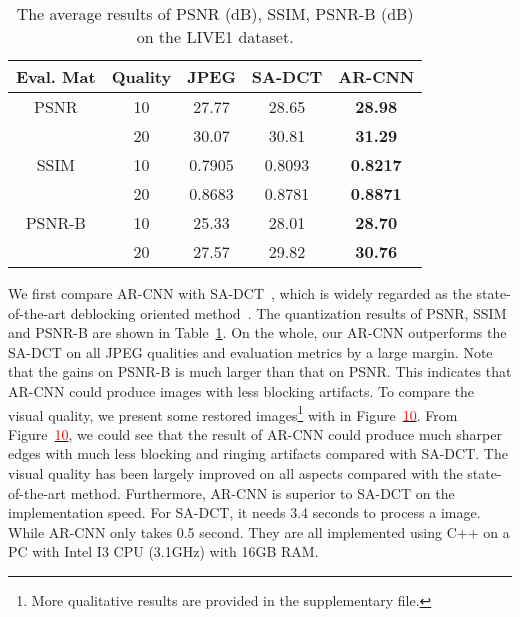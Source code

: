 \documentclass[10pt,twocolumn,letterpaper]{article}
\begin{document}
\label{sec:sadct}
\begin{table}\scriptsize
\caption{The average results of PSNR (dB), SSIM, PSNR-B (dB) on the LIVE1 dataset.}\label{tab:sadct}
\vspace{-0.15cm}
\begin{center}
\begin{tabular}{|c|c|c|c|c|}
\hline
 Eval. Mat & Quality & JPEG & SA-DCT & AR-CNN \\

\hline\hline
PSNR & 10 & 27.77 & 28.65 & \textbf{28.98}   \\
     & 20 & 30.07 & 30.81 & \textbf{31.29}   \\
\hline\hline
SSIM & 10 & 0.7905 & 0.8093 & \textbf{0.8217}   \\
     & 20 & 0.8683 & 0.8781 & \textbf{0.8871}   \\
\hline\hline
PSNR-B & 10 & 25.33 & 28.01 & \textbf{28.70}   \\
     & 20 & 27.57 & 29.82 & \textbf{30.76}  \\
\hline
\end{tabular}
\vspace{-0.65cm}
\end{center}
\end{table}

We first compare AR-CNN with SA-DCT~\cite{Foi2007}, which is widely regarded as the state-of-the-art deblocking oriented method~\cite{Jancsary2012,Li2014}. The quantization results of PSNR, SSIM and PSNR-B are shown in Table~\ref{tab:sadct}. On the whole, our AR-CNN outperforms the SA-DCT on all JPEG qualities and evaluation metrics by a large margin. Note that the gains on PSNR-B is much larger than that on PSNR. This indicates that AR-CNN could produce images with less blocking artifacts.
To compare the visual quality, we present some restored images\footnote{\label{note1}More qualitative results are provided in the supplementary file.} with  in Figure~\hyperlink{page.8}{\textcolor{red}{10}}.
From Figure~\hyperlink{page.8}{\textcolor{red}{10}}, we could see that the result of AR-CNN could produce much sharper edges with much less blocking and ringing artifacts compared with SA-DCT.
The visual quality has been largely improved on all aspects compared with the state-of-the-art method.
Furthermore, AR-CNN is superior to SA-DCT on the implementation speed. For SA-DCT, it needs 3.4 seconds to process a  image. While AR-CNN only takes 0.5 second. They are all implemented using C++ on a PC with Intel I3 CPU (3.1GHz) with 16GB RAM.
\end{document}
